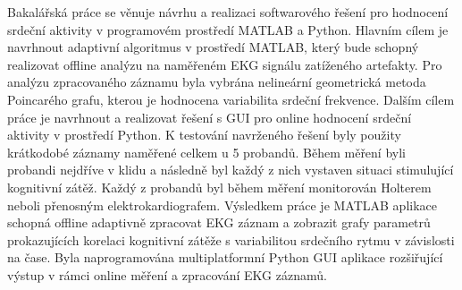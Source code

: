 Bakalářská práce se věnuje návrhu a realizaci softwarového řešení pro hodnocení
srdeční aktivity v programovém prostředí MATLAB a Python. Hlavním cílem je
navrhnout adaptivní algoritmus v prostředí MATLAB, který bude schopný realizovat
offline analýzu na naměřeném EKG signálu zatíženého artefakty. Pro analýzu
zpracovaného záznamu byla vybrána nelineární geometrická metoda Poincarého
grafu, kterou je hodnocena variabilita srdeční frekvence. Dalším cílem práce je
navrhnout a realizovat řešení s GUI pro online hodnocení srdeční aktivity v
prostředí Python. K testování navrženého řešení byly použity krátkodobé záznamy
naměřené celkem u 5 probandů. Během měření byli probandi nejdříve v klidu a
následně byl každý z nich vystaven situaci stimulující kognitivní zátěž. Každý z
probandů byl během měření monitorován Holterem neboli přenosným
elektrokardiografem. Výsledkem práce je MATLAB aplikace schopná offline
adaptivně zpracovat EKG záznam a zobrazit grafy parametrů prokazujících korelaci
kognitivní zátěže s variabilitou srdečního rytmu v závislosti na čase. Byla
naprogramována multiplatformní Python GUI aplikace rozšiřující výstup v rámci
online měření a zpracování EKG záznamů. 


